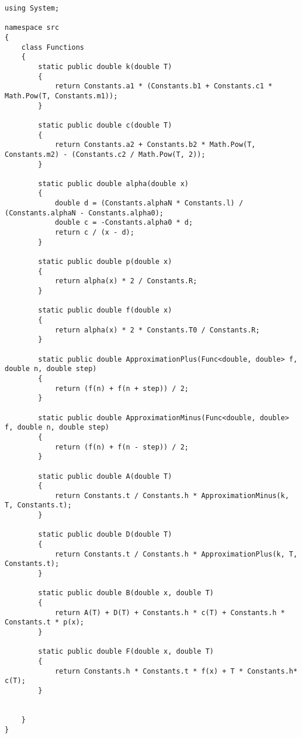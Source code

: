 \documentclass[a4paper,oneside,12pt]{extreport}
\begin{document}
\begin{lstlisting}[]
using System;

namespace src
{
	class Functions
	{
		static public double k(double T)
		{
			return Constants.a1 * (Constants.b1 + Constants.c1 * Math.Pow(T, Constants.m1));
		}

		static public double c(double T)
		{
			return Constants.a2 + Constants.b2 * Math.Pow(T, Constants.m2) - (Constants.c2 / Math.Pow(T, 2));
		}
		
		static public double alpha(double x)
		{
			double d = (Constants.alphaN * Constants.l) / (Constants.alphaN - Constants.alpha0);
			double c = -Constants.alpha0 * d;
			return c / (x - d);
		}

		static public double p(double x)
		{
			return alpha(x) * 2 / Constants.R;
		}

		static public double f(double x)
		{
			return alpha(x) * 2 * Constants.T0 / Constants.R;
		}

		static public double ApproximationPlus(Func<double, double> f, double n, double step)
		{
			return (f(n) + f(n + step)) / 2;
		}

		static public double ApproximationMinus(Func<double, double> f, double n, double step)
		{
			return (f(n) + f(n - step)) / 2;
		}

		static public double A(double T)
		{
			return Constants.t / Constants.h * ApproximationMinus(k, T, Constants.t);
		}

		static public double D(double T)
		{
			return Constants.t / Constants.h * ApproximationPlus(k, T, Constants.t);
		}

		static public double B(double x, double T)
		{
			return A(T) + D(T) + Constants.h * c(T) + Constants.h * Constants.t * p(x);
		}

		static public double F(double x, double T)
		{
			return Constants.h * Constants.t * f(x) + T * Constants.h* c(T);
		}


	}
}
\end{lstlisting}
\end{document}
